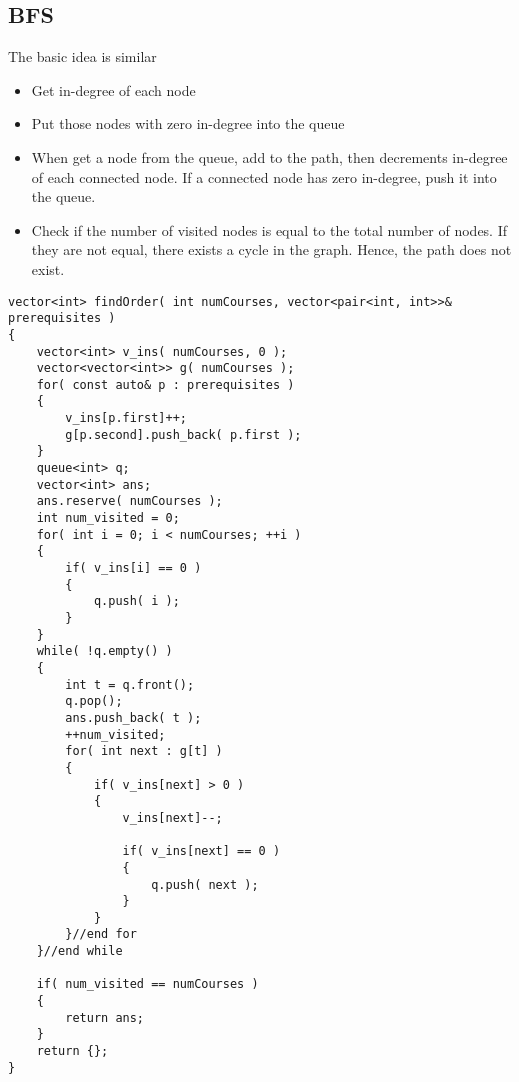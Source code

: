 \subsection{BFS}
The basic idea is similar
\begin{itemize}
    \item Get in-degree of each node
    \item Put those nodes with zero in-degree into the queue
    \item When get a node from the queue, add to the path, then decrements in-degree of each connected node. If a connected node has zero in-degree, push it into the queue.
    \item Check if the number of visited nodes is equal to the total number of nodes. If they are not equal, there exists a cycle in the graph. Hence, the path does not exist.
\end{itemize}
\begin{lstlisting}[style=customc, caption={BFS}]
vector<int> findOrder( int numCourses, vector<pair<int, int>>& prerequisites )
{
    vector<int> v_ins( numCourses, 0 );
    vector<vector<int>> g( numCourses );
    for( const auto& p : prerequisites )
    {
        v_ins[p.first]++;
        g[p.second].push_back( p.first );
    }
    queue<int> q;
    vector<int> ans;
    ans.reserve( numCourses );
    int num_visited = 0;
    for( int i = 0; i < numCourses; ++i )
    {
        if( v_ins[i] == 0 )
        {
            q.push( i );
        }
    }
    while( !q.empty() )
    {
        int t = q.front();
        q.pop();
        ans.push_back( t );
        ++num_visited;
        for( int next : g[t] )
        {
            if( v_ins[next] > 0 )
            {
                v_ins[next]--;

                if( v_ins[next] == 0 )
                {
                    q.push( next );
                }
            }
        }//end for
    }//end while

    if( num_visited == numCourses )
    {
        return ans;
    }
    return {};
}
\end{lstlisting}